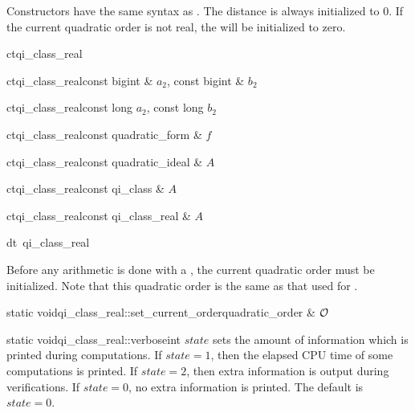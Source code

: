 \CONS

Constructors have the same syntax as .  The distance is always initialized to 0.
If the current quadratic order is not real, the  will be initialized to
zero.

\begin{fcode}{ct}{qi_class_real}{}
\end{fcode}

\begin{fcode}{ct}{qi_class_real}{const bigint & $a_2$, const bigint & $b_2$}
\end{fcode}

\begin{fcode}{ct}{qi_class_real}{const long $a_2$, const long $b_2$}
\end{fcode}

\begin{fcode}{ct}{qi_class_real}{const quadratic_form & $f$}
\end{fcode}

\begin{fcode}{ct}{qi_class_real}{const quadratic_ideal & $A$}
\end{fcode}

\begin{fcode}{ct}{qi_class_real}{const qi_class & $A$}
\end{fcode}

\begin{fcode}{ct}{qi_class_real}{const qi_class_real & $A$}
\end{fcode}

\begin{fcode}{dt}{~qi_class_real}{}
\end{fcode}



\INIT

Before any arithmetic is done with a , the current quadratic order must be
initialized.  Note that this quadratic order is the same as that used for .

\begin{fcode}{static void}{qi_class_real::set_current_order}{quadratic_order & $\mathcal{O}$}
\end{fcode}

\begin{fcode}{static void}{qi_class_real::verbose}{int $\mathit{state}$}
  sets the amount of information which is printed during computations.  If $\mathit{state} = 1$,
  then the elapsed CPU time of some computations is printed.  If $\mathit{state} = 2$, then
  extra information is output during verifications.  If $\mathit{state} = 0$, no extra
  information is printed.  The default is $\mathit{state} = 0$.
\end{fcode}

